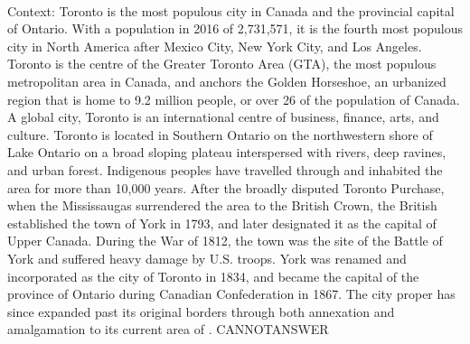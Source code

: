 \documentclass[11pt,a4paper, onecolumn]{article}
\begin{document}
\\ Context: Toronto is the most populous city in Canada and the provincial capital of Ontario. With a population in 2016 of 2,731,571, it is the fourth most populous city in North America after Mexico City, New York City, and Los Angeles. Toronto is the centre of the Greater Toronto Area (GTA), the most populous metropolitan area in Canada, and anchors the Golden Horseshoe, an urbanized region that is home to 9.2 million people, or over 26  of the population of Canada. A global city, Toronto is an international centre of business, finance, arts, and culture. Toronto is located in Southern Ontario on the northwestern shore of Lake Ontario on a broad sloping plateau interspersed with rivers, deep ravines, and urban forest. Indigenous peoples have travelled through and inhabited the area for more than 10,000 years. After the broadly disputed Toronto Purchase, when the Mississaugas surrendered the area to the British Crown, the British established the town of York in 1793, and later designated it as the capital of Upper Canada. During the War of 1812, the town was the site of the Battle of York and suffered heavy damage by U.S. troops. York was renamed and incorporated as the city of Toronto in 1834, and became the capital of the province of Ontario during Canadian Confederation in 1867. The city proper has since expanded past its original borders through both annexation and amalgamation to its current area of . CANNOTANSWER
\end{document}
